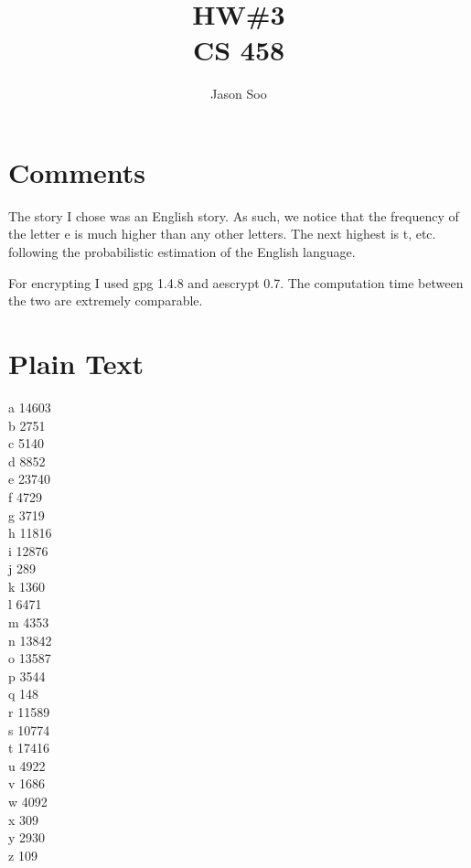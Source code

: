 \documentclass[twocolumn]{article}
\title{HW\#3\\CS 458}
\author{Jason Soo}
\begin{document}
	\maketitle
	
	\section*{Comments} %
	\label{sec:comments}
	
	The story I chose was an English story.  As such, we notice that the frequency of the letter e is much higher than any other letters.  The next highest is t, etc. following the probabilistic estimation of the English language.
	
	For encrypting I used gpg 1.4.8 and aescrypt 0.7.  The computation time between the two are extremely comparable.
	
	
	\section*{Plain Text} %
	\label{sec:plain_text}
	
	a 14603\\
	b 2751\\
	c 5140\\
	d 8852\\
	e 23740\\
	f 4729\\
	g 3719\\
	h 11816\\
	i 12876\\
	j 289\\
	k 1360\\
	l 6471\\
	m 4353\\
	n 13842\\
	o 13587\\
	p 3544\\
	q 148\\
	r 11589\\
	s 10774\\
	t 17416\\
	u 4922\\
	v 1686\\
	w 4092\\
	x 309\\
	y 2930\\
	z 109\\
	
	
\end{document}
